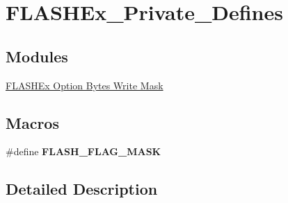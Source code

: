 \hypertarget{group___f_l_a_s_h_ex___private___defines}{\section{F\-L\-A\-S\-H\-Ex\-\_\-\-Private\-\_\-\-Defines}
\label{group___f_l_a_s_h_ex___private___defines}
}
\subsection*{Modules}
\begin{DoxyCompactItemize}
\item 
\hyperlink{group___f_l_a_s_h_ex___option___bytes___write___mask}{F\-L\-A\-S\-H\-Ex Option Bytes Write Mask}
\end{DoxyCompactItemize}
\subsection*{Macros}
\begin{DoxyCompactItemize}
\item 
\#define {\bfseries F\-L\-A\-S\-H\-\_\-\-F\-L\-A\-G\-\_\-\-M\-A\-S\-K}
\end{DoxyCompactItemize}


\subsection{Detailed Description}


